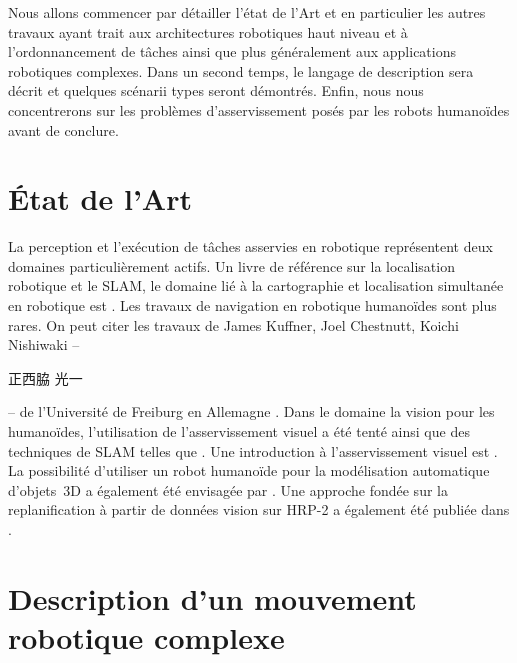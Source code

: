 Nous allons commencer par détailler l'état de l'Art et en particulier
les autres travaux ayant trait aux architectures robotiques haut
niveau et à l'ordonnancement de tâches ainsi que plus généralement aux
applications robotiques complexes. Dans un second temps, le langage de
description sera décrit et quelques scénarii types seront
démontrés. Enfin, nous nous concentrerons sur les problèmes
d'asservissement posés par les robots humanoïdes avant de conclure.


\section{État de l'Art}


La perception et l'exécution de tâches asservies en robotique
représentent deux domaines particulièrement actifs. Un livre de
référence sur la localisation robotique et le SLAM, le domaine lié à la cartographie
et localisation simultanée en robotique est \cite{05thrun}. Les
travaux de navigation en robotique humanoïdes sont plus rares. On peut
citer les travaux de James Kuffner, Joel Chestnutt, Koichi Nishiwaki
-- \begin{CJK*}{UTF8}{min}正西脇 光一\end{CJK*} --
  \cite{05michel.humanoids,05ozawa.smc,03chestnutt.humanoids,02nishiwaki.rsj}
  de l'Université de Freiburg en Allemagne \cite{10osswald.icra}. Dans
  le domaine la vision pour les humanoïdes, l'utilisation de
  l'asservissement visuel a été tenté \cite{10dune.iros} ainsi que des
  techniques de SLAM telles que
  \cite{06stasse.iros,09kwak.humanoids}. Une introduction à
  l'asservissement visuel est
  \cite{06chaumette.ram,07chaumette.ram}. La possibilité d'utiliser un
  robot humanoïde pour la modélisation automatique d'objets 3D a
  également été envisagée par \cite{09foisotte.icra,08stasse.ras}. Une
  approche fondée sur la replanification à partir de données vision
  sur HRP-2 a également été publiée dans
  \cite{11dang.humanoids}.


\section{Description d'un mouvement robotique complexe}


